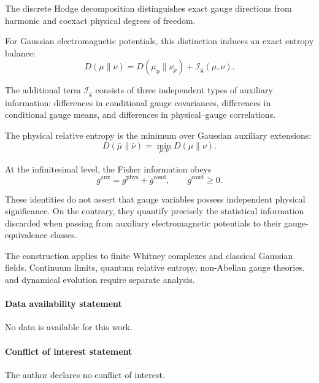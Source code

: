 \documentclass[11pt]{article}
\theoremstyle{remark}
\begin{document}
The discrete Hodge decomposition distinguishes exact gauge
directions from harmonic and coexact physical degrees of
freedom.

For Gaussian electromagnetic potentials, this distinction
induces an exact entropy balance:
\begin{equation}
\boxed{
D(\mu\|\nu)
=
D(\mu_{\mathrm p}\|\nu_{\mathrm p})
+
\mathcal I_{\mathrm g}(\mu,\nu).
}
\label{eq:final-chain}
\end{equation}

The additional term
\(\mathcal I_{\mathrm g}\) consists of three independent
types of auxiliary information: differences in conditional
gauge covariances, differences in conditional gauge means,
and differences in physical--gauge correlations.

The physical relative entropy is the minimum over Gaussian
auxiliary extensions:
\begin{equation}
D(\bar\mu\|\bar\nu)
=
\min_{\mu,\nu}
D(\mu\|\nu).
\label{eq:final-minimum}
\end{equation}

At the infinitesimal level, the Fisher information obeys
\begin{equation}
g^{\mathrm{aux}}
=
g^{\mathrm{phys}}
+
g^{\mathrm{cond}},
\qquad
g^{\mathrm{cond}}\geq0.
\label{eq:final-fisher}
\end{equation}

These identities do not assert that gauge variables possess
independent physical significance. On the contrary, they
quantify precisely the statistical information discarded
when passing from auxiliary electromagnetic potentials to
their gauge-equivalence classes.

The construction applies to finite Whitney complexes and
classical Gaussian fields. Continuum limits, quantum
relative entropy, non-Abelian gauge theories, and dynamical
evolution require separate analysis.

\vskip 12pt



\paragraph{\bf Data availability statement} No data is available for this work.

\vskip 12pt

\paragraph{\bf Conflict of interest statement} The author declares no conflict of interest.
\end{document}
